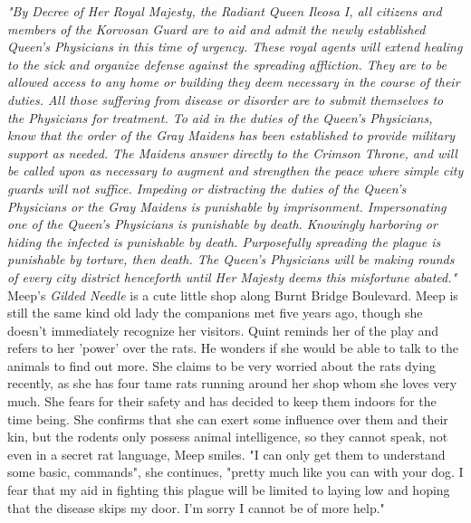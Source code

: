  {\itshape "By Decree of Her Royal Majesty, the Radiant Queen Ileosa I, all citizens and members of the Korvosan Guard are to aid and admit the newly established Queen's Physicians in this time of urgency. These royal agents will extend healing to the sick and organize defense against the spreading affliction. They are to be allowed access to any home or building they deem necessary in the course of their duties. All those suffering from disease or disorder are to submit themselves to the Physicians for treatment. To aid in the duties of the Queen's Physicians, know that the order of the Gray Maidens has been established to provide military support as needed. The Maidens answer directly to the Crimson Throne, and will be called upon as necessary to augment and strengthen the peace where simple city guards will not suffice. Impeding or distracting the duties of the Queen's Physicians or the Gray Maidens is punishable by imprisonment. Impersonating one of the Queen's Physicians is punishable by death. Knowingly harboring or hiding the infected is punishable by death. Purposefully spreading the plague is punishable by torture, then death. The Queen's Physicians will be making rounds of every city district henceforth until Her Majesty deems this misfortune abated."}  Meep's {\itshape Gilded Needle} is a cute little shop along Burnt Bridge Boulevard. Meep is still the same kind old lady the companions met five years ago, though she doesn't immediately recognize her visitors. Quint reminds her of the play and refers to her 'power' over the rats. He wonders if she would be able to talk to the animals to find out more. She claims to be very worried about the rats dying recently, as she has four tame rats running around her shop whom she loves very much. She fears for their safety and has decided to keep them indoors for the time being. She confirms that she can exert some influence over them and their kin, but the rodents only possess animal intelligence, so they cannot speak, not even in a secret rat language, Meep smiles. "I can only get them to understand some basic, commands", she continues, "pretty much like you can with your dog. I fear that my aid in fighting this plague will be limited to laying low and hoping that the disease skips my door. I'm sorry I cannot be of more help." 